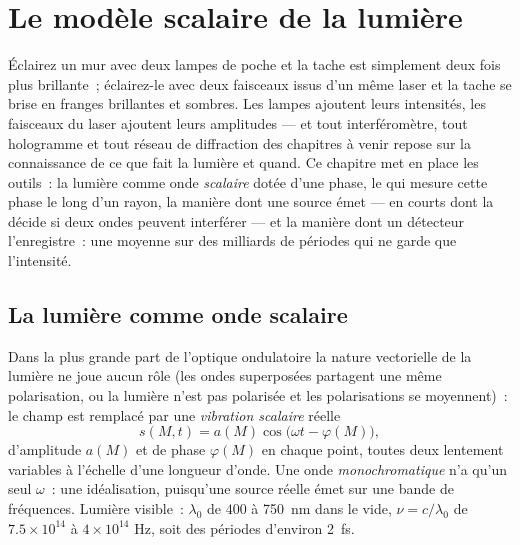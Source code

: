 \chapter{Le modèle scalaire de la lumière}\label{ch:b2:scalar-light-model}

Éclairez un mur avec deux lampes de poche et la tache est simplement deux fois plus
brillante~; éclairez-le avec deux faisceaux issus d'un même laser et la tache se brise en
franges brillantes et sombres. Les lampes ajoutent leurs intensités, les faisceaux du laser
ajoutent leurs amplitudes --- et tout interféromètre, tout hologramme et tout réseau
de diffraction des chapitres à venir repose sur la connaissance de ce que fait la lumière
et quand. Ce chapitre met en place les outils~: la lumière comme onde \emph{scalaire}
dotée d'une phase, le \emph{} qui mesure cette phase
le long d'un rayon, la manière dont une source émet --- en courts  dont la
\emph{} décide si deux ondes peuvent interférer --- et
la manière dont un détecteur l'enregistre~: une moyenne sur des milliards de périodes
qui ne garde que l'intensité.

\section{La lumière comme onde scalaire}

\begin{definition}\label{def:b2:scalar-light-model:scalar}
Dans la plus grande part de l'optique ondulatoire la nature vectorielle de la lumière ne joue aucun rôle (les
ondes superposées partagent une même polarisation, ou la lumière n'est pas polarisée
et les polarisations se moyennent)~: le champ est remplacé par une \emph{vibration
scalaire} réelle
\[
s(M, t) = a(M)\cos\bigl(\omega t - \varphi(M)\bigr) ,
\]
d'amplitude $a(M)$ et de phase $\varphi(M)$ en chaque point, toutes deux
lentement variables à l'échelle d'une longueur d'onde. Une onde \emph{monochromatique}
n'a qu'un seul $\omega$~: une idéalisation, puisqu'une source réelle émet
sur une bande de fréquences. Lumière visible~: $\lambda_0$ de $400$ à
\qty{750}{nm} dans le vide, $\nu = c/\lambda_0$ de $7.5 \times 10^{14}$ à $4 \times 10^{14}$ Hz,
soit des périodes d'environ \qty{2}{fs}.
\end{definition}

